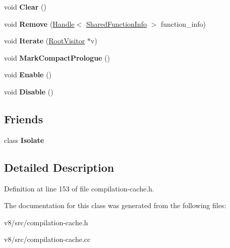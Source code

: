 \begin{DoxyCompactItemize}
\item 
\mbox{\label{classv8_1_1internal_1_1CompilationCache_acef1c5d4de3a72dff9ed45578087bec3}} 
void {\bfseries Clear} ()
\item 
\mbox{\label{classv8_1_1internal_1_1CompilationCache_a870250701c54985a59a2fc6bed4a2323}} 
void {\bfseries Remove} (\mbox{\hyperlink{classv8_1_1internal_1_1Handle}{Handle}}$<$ \mbox{\hyperlink{classv8_1_1internal_1_1SharedFunctionInfo}{Shared\+Function\+Info}} $>$ function\+\_\+info)
\item 
\mbox{\label{classv8_1_1internal_1_1CompilationCache_a71ea83b1a9ea419ecc0d21a23e466663}} 
void {\bfseries Iterate} (\mbox{\hyperlink{classv8_1_1internal_1_1RootVisitor}{Root\+Visitor}} $\ast$v)
\item 
\mbox{\label{classv8_1_1internal_1_1CompilationCache_a6c6f1bec5e0eeb46801ff0f051fd381a}} 
void {\bfseries Mark\+Compact\+Prologue} ()
\item 
\mbox{\label{classv8_1_1internal_1_1CompilationCache_a6d0cf1b1046d4d5cc267b0c5283f3184}} 
void {\bfseries Enable} ()
\item 
\mbox{\label{classv8_1_1internal_1_1CompilationCache_a819ae9c9a4c7d9761173b96bae5494e4}} 
void {\bfseries Disable} ()
\end{DoxyCompactItemize}
\subsection*{Friends}
\begin{DoxyCompactItemize}
\item 
\mbox{\label{classv8_1_1internal_1_1CompilationCache_aba4f0964bdacf2bbf62cf876e5d28d0a}} 
class {\bfseries Isolate}
\end{DoxyCompactItemize}


\subsection{Detailed Description}


Definition at line 153 of file compilation-\/cache.\+h.



The documentation for this class was generated from the following files\+:\begin{DoxyCompactItemize}
\item 
v8/src/compilation-\/cache.\+h\item 
v8/src/compilation-\/cache.\+cc\end{DoxyCompactItemize}
